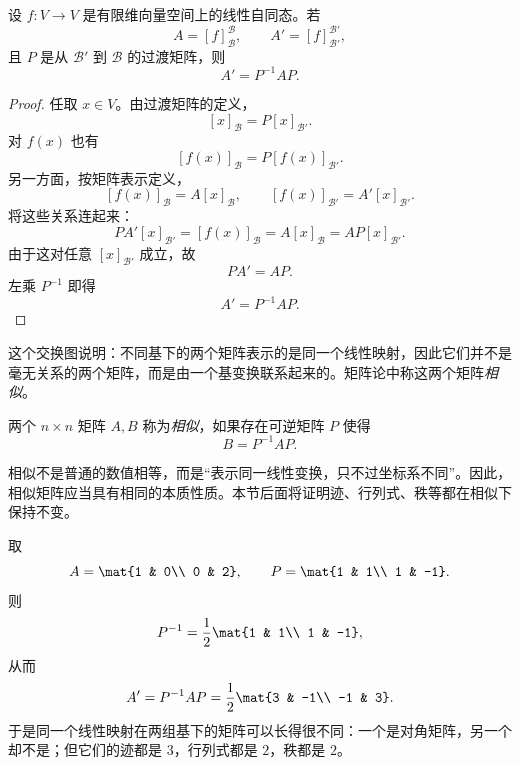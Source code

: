 \begin{theorem}[基变换公式]
设 $f\colon V\to V$ 是有限维向量空间上的线性自同态。若
\[
  A=[f]_{\mathcal B}^{\mathcal B},
  \qquad
  A'=[f]_{\mathcal B'}^{\mathcal B'},
\]
且 $P$ 是从 $\mathcal B'$ 到 $\mathcal B$ 的过渡矩阵，则
\[
  A'=P^{-1}AP.
\]
\end{theorem}

\begin{proof}
任取 $x\in V$。由过渡矩阵的定义，
\[
  [x]_{\mathcal B}=P[x]_{\mathcal B'}.
\]
对 $f(x)$ 也有
\[
  [f(x)]_{\mathcal B}=P[f(x)]_{\mathcal B'}.
\]
另一方面，按矩阵表示定义，
\[
  [f(x)]_{\mathcal B}=A[x]_{\mathcal B},
  \qquad
  [f(x)]_{\mathcal B'}=A'[x]_{\mathcal B'}.
\]
将这些关系连起来：
\[
  P A'[x]_{\mathcal B'}=[f(x)]_{\mathcal B}=A[x]_{\mathcal B}=AP[x]_{\mathcal B'}.
\]
由于这对任意 $[x]_{\mathcal B'}$ 成立，故
\[
  PA'=AP.
\]
左乘 $P^{-1}$ 即得
\[
  A'=P^{-1}AP.
\]
\end{proof}

\begin{center}
\end{center}

这个交换图说明：不同基下的两个矩阵表示的是同一个线性映射，因此它们并不是毫无关系的两个矩阵，而是由一个基变换联系起来的。矩阵论中称这两个矩阵\emph{相似}。

\begin{definition}
两个 $n\times n$ 矩阵 $A,B$ 称为\emph{相似}，如果存在可逆矩阵 $P$ 使得
\[
  B=P^{-1}AP.
\]
\end{definition}

\begin{remark}
相似不是普通的数值相等，而是“表示同一线性变换，只不过坐标系不同”。因此，相似矩阵应当具有相同的本质性质。本节后面将证明迹、行列式、秩等都在相似下保持不变。
\end{remark}

\begin{example}
取
\[
  A=\mat{1 & 0\\ 0 & 2},
  \qquad
  P=\mat{1 & 1\\ 1 & -1}.
\]
则
\[
  P^{-1}=\frac12\mat{1 & 1\\ 1 & -1},
\]
从而
\[
  A'=P^{-1}AP=\frac12\mat{3 & -1\\ -1 & 3}.
\]
于是同一个线性映射在两组基下的矩阵可以长得很不同：一个是对角矩阵，另一个却不是；但它们的迹都是 $3$，行列式都是 $2$，秩都是 $2$。
\end{example}

